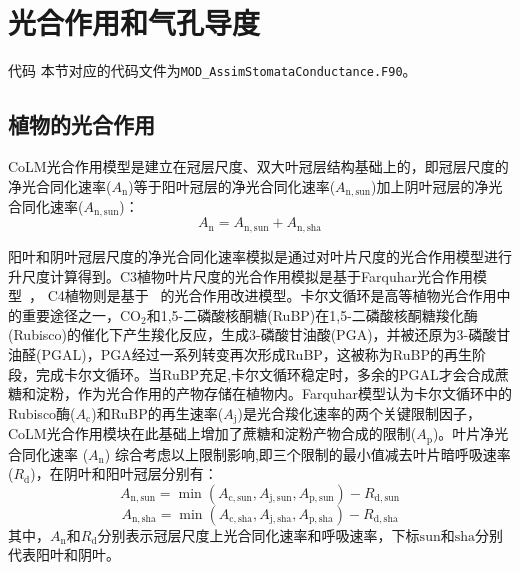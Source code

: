 \chapter{光合作用和气孔导度}
\begin{mymdframed}{代码}
本节对应的代码文件为\texttt{MOD\_AssimStomataConductance.F90}。
\end{mymdframed}


\section{植物的光合作用}\label{植物的光合作用}
CoLM光合作用模型是建立在冠层尺度、双大叶冠层结构基础上的，即冠层尺度的净光合同化速率($A_{\mathrm{n}}$)等于阳叶冠层的净光合同化速率($A_{\mathrm{n,sun}}$)加上阴叶冠层的净光合同化速率($A_{\mathrm{n,sun}}$)：
\begin{equation}\label{Ansun_Ansha}
A_{\mathrm{n}}=A_{\mathrm{n,sun}}+A_{\mathrm{n,sha}}
\end{equation}

阳叶和阴叶冠层尺度的净光合同化速率模拟是通过对叶片尺度的光合作用模型进行升尺度计算得到。C3植物叶片尺度的光合作用模拟是基于Farquhar光合作用模型~\citep{farquhar1980biochemical}，
C4植物则是基于~\citet{collatz1992} 的光合作用改进模型。卡尔文循环是高等植物光合作用中的重要途径之一，CO$_2$和1,5-二磷酸核酮糖(RuBP)在1,5-二磷酸核酮糖羧化酶(Rubisco)的催化下产生羧化反应，生成3-磷酸甘油酸(PGA)，并被还原为3-磷酸甘油醛(PGAL)，PGA经过一系列转变再次形成RuBP，这被称为RuBP的再生阶段，完成卡尔文循环。当RuBP充足,卡尔文循环稳定时，多余的PGAL才会合成蔗糖和淀粉，作为光合作用的产物存储在植物内。Farquhar模型认为卡尔文循环中的Rubisco酶($A_{\mathrm{c}}$)和RuBP的再生速率($A_{\mathrm{j}}$)是光合羧化速率的两个关键限制因子，CoLM光合作用模块在此基础上增加了蔗糖和淀粉产物合成的限制($A_{\mathrm{p}}$)。叶片净光合同化速率 ($A_{\mathrm{n}}$) 综合考虑以上限制影响,即三个限制的最小值减去叶片暗呼吸速率 ($R_{\mathrm {d}}$)，在阴叶和阳叶冠层分别有：
\begin{equation}\label{An1sun}
A_{\mathrm{n,sun}}=\min \left(A_{\mathrm{c,sun}}, A_{\mathrm{j,sun}}, A_{\mathrm{p,sun}}\right)-R_{\mathrm{d,sun}}
\end{equation}
\begin{equation}\label{An1sha}
A_{\mathrm{n,sha}}=\min \left(A_{\mathrm{c,sha}}, A_{\mathrm{j,sha}}, A_{\mathrm{p,sha}}\right)-R_{\mathrm{d,sha}}
\end{equation}
其中，$A_{\mathrm{n}}$和$R_{\mathrm d}$分别表示冠层尺度上光合同化速率和呼吸速率，下标${\mathrm {sun}}$和${\mathrm {sha}}$分别代表阳叶和阴叶。


